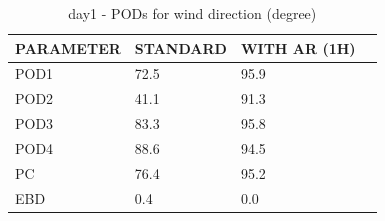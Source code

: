 \begin{table}[p!]
\begin{center}
\begin{tabular}{|l|l|l|l|}
\hline
\multicolumn{1}{|c|}{\cellcolor[HTML]{C0C0C0}\textbf{PARAMETER}} & \multicolumn{1}{c|}{\cellcolor[HTML]{C0C0C0}\textbf{STANDARD}} & \multicolumn{1}{c|}{\cellcolor[HTML]{C0C0C0}\textbf{WITH AR (1H)}} \\
\hline
\cellcolor[HTML]{C0C0C0}POD1  & 72.5      & 95.9     \\
\cellcolor[HTML]{C0C0C0}POD2  & 41.1      & 91.3     \\
\cellcolor[HTML]{C0C0C0}POD3  & 83.3      & 95.8     \\
\cellcolor[HTML]{C0C0C0}POD4  & 88.6      & 94.5     \\
\cellcolor[HTML]{C0C0C0}PC    & 76.4        & 95.2       \\
\cellcolor[HTML]{C0C0C0}EBD   & 0.4       & 0.0      \\
\hline
\end{tabular}
\caption{day1 - PODs for wind direction (degree)}
\label{tab:podwd:day1}
\end{center}
\end{table}
